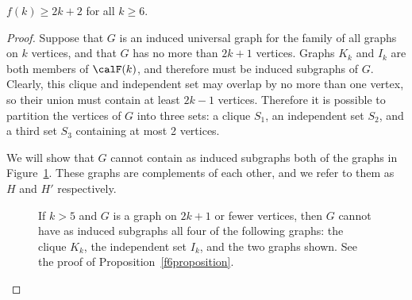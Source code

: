 \begin{proposition}\label{f6proposition}
    $f(k) \geq 2k + 2$ for all $k \geq 6$.
\end{proposition}
\begin{proof}

    Suppose that $G$ is an induced universal graph for the family of all graphs
    on $k$ vertices, and that $G$ has no more than $2k + 1$ vertices.  Graphs
    $K_k$ and $I_k$ are both members of $\calF(k)$, and therefore must
    be induced subgraphs of $G$.  Clearly, this clique and
    independent set may overlap by no more than one vertex, so their union must
    contain at least $2k - 1$ vertices.  Therefore it is possible to partition
    the vertices of $G$ into three sets: a clique $S_1$, an independent set
    $S_2$, and a third set $S_3$ containing at most 2 vertices.

    We will show that $G$ cannot contain as induced subgraphs both
    of the graphs in Figure~\ref{fig:boundproof}.  These graphs are complements
    of each other, and we refer to them as $H$ and $H'$ respectively.

\begin{figure}[htb]
    \centering
{}
\qquad \qquad
{}
\caption{If $k > 5$ and $G$ is a graph on $2k + 1$ or fewer vertices, then
$G$ cannot have as induced subgraphs all four of the following graphs: the
clique $K_k$, the independent set $I_k$, and
the two graphs shown. See the proof of Proposition~\ref{f6proposition}.}
\label{fig:boundproof}
\end{figure}


\end{proof}
